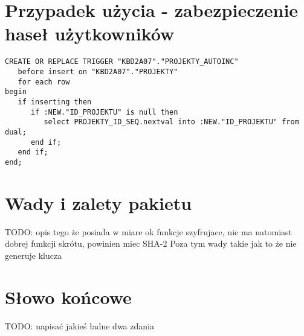 \documentclass[12pt, a4paper]{article}
\begin{document}
\section{Przypadek użycia - zabezpieczenie haseł użytkowników}
  
\begin{lstlisting}
CREATE OR REPLACE TRIGGER "KBD2A07"."PROJEKTY_AUTOINC"
   before insert on "KBD2A07"."PROJEKTY"
   for each row
begin
   if inserting then
      if :NEW."ID_PROJEKTU" is null then
         select PROJEKTY_ID_SEQ.nextval into :NEW."ID_PROJEKTU" from dual;
      end if;
   end if;
end;
\end{lstlisting}
  

\section{Wady i zalety pakietu}
TODO: opis tego że posiada w miare ok funkcje szyfrujace, nie ma
natomiast
dobrej funkcji skrótu, powinien miec SHA-2
Poza tym wady takie jak to że nie generuje klucza

\section{Słowo końcowe}
TODO: napisać jakieś ładne dwa zdania
\end{document}
